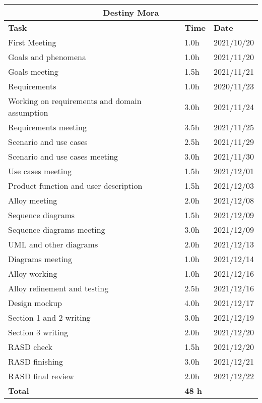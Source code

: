 \begin{table}[!ht]
\centering
\begin{tabular}{|p{}|p{}|p{}|}
\hline
\multicolumn{3}{|c|}{\textbf{Destiny Mora}}            \\ \hline
\textbf{Task}                   & \textbf{Time} & \textbf{Date} \\ \hline

First Meeting				&		1.0h	   &	2021/10/20 \\ \hline
Goals and phenomena			&		1.0h	   & 	2021/11/20 \\ \hline
Goals meeting					&		1.5h	   &	2021/11/21 \\ \hline
Requirements		&		1.0h	   &	2020/11/23 \\ \hline
Working on requirements and domain assumption			&		3.0h	   &	2021/11/24 \\ \hline
Requirements  meeting		&		3.5h	   &	2021/11/25 \\ \hline
Scenario and use cases		&		2.5h    &   	2021/11/29 \\ \hline
Scenario and use cases meeting     	&		3.0h	   & 	2021/11/30 \\ \hline
Use cases meeting		&		1.5h	   & 	2021/12/01 \\ \hline
Product function and user description		&		1.5h	   & 	2021/12/03 \\ \hline
Alloy meeting				&		2.0h     &	2021/12/08 \\ \hline
Sequence diagrams			&		1.5h	  &	2021/12/09 \\ \hline
Sequence diagrams meeting				&		3.0h	   & 	2021/12/09 \\ \hline
UML and other diagrams				&		2.0h	   & 	2021/12/13 \\ \hline
Diagrams meeting				&		1.0h	   & 	2021/12/14 \\ \hline
Alloy working		&		1.0h	  &    2021/12/16 \\ \hline
Alloy refinement and testing		&		2.5h	  &    2021/12/16 \\ \hline
Design mockup			&		4.0h	  &    2021/12/17 \\ \hline 
Section 1 and 2 writing 			&		3.0h	  &    2021/12/19 \\ \hline 
Section 3 writing 			&		2.0h	  &    2021/12/20 \\ \hline 
RASD check				&		1.5h   &	2021/12/20 \\ \hline
RASD finishing				&		3.0h	  &    2021/12/21  \\ \hline
RASD final review			&		2.0h	  &    2021/12/22  \\ \hline
\textbf{Total}                  		&  \textbf{48 h}   & \\ \hline
\end{tabular}
\end{table}

